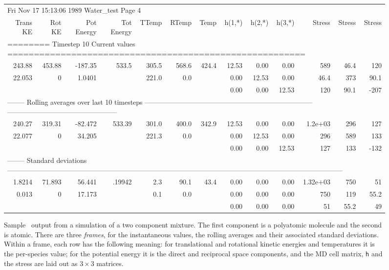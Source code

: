 \begin{figure}
\caption[Sample \moldy\  output.]{Sample \moldy\  output from a simulation 
of a two component mixture.  The first component is a polyatomic
molecule and the second is atomic.  There are three {\em frames}, for
the instantaneous values, the rolling averages and their associated
standard deviations.  Within a frame, each row has the following
meaning: for translational and rotational kinetic energies and
temperatures it is the per-species value; for the potential energy it
is the direct and reciprocal space components, and the MD cell matrix,
{\tt h} and the stress are laid out as $3\times 3$ matrices.}
\label{fig:output}
\tiny
%
\begin{tabular}{rrrrrrrr
@{\hspace{1em}}r@{\hspace{1em}}rr@{\hspace{1em}}r@{\hspace{1em}}r}
\multicolumn{13}{l}{      Fri Nov 17 15:13:06 1989        Water\_test
Page 4} \\
Trans KE & Rot KE & Pot Energy & Tot Energy & TTemp & RTemp & Temp &
h(1,*) & h(2,*) & h(3,*) & Stress & Stress & Stress \\
\multicolumn{13}{l}{ ======== Timestep 10      Current values
======================================================== } \\
243.88 & 453.88  & -187.35  & 533.5  & 305.5  & 568.6  & 424.4  &
12.53  & 0.00  & 0.00  & 589  & 46.4  & 120 \\
22.053  & 0  & 1.0401 & & 221.0  & 0.0 & & 0.00  & 12.53  & 0.00  & 46.4
& 373  & 90.1 \\
 &  &  &  &  & & &  0.00  & 0.00  & 12.53 & 120  & 90.1  & -207 \\
\multicolumn{13}{l}{ -------- Rolling averages over last 10 timesteps
--------------------------------------------------------------------------
------------------------------------------------
} \\
240.27 & 319.31 & -82.472 & 533.39 & 301.0 & 400.0 & 342.9 & 12.53 &
0.00 & 0.00 & 1.2e+03 & 296 & 127 \\
22.077 & 0 & 34.205  & & 221.3 & 0.0 & & 0.00 & 12.53 & 0.00 & 296 &
589 & 133 \\
& & & & & & & 0.00 & 0.00 & 12.53 & 127 & 133 & -132 \\
\multicolumn{13}{l}{ -------- Standard deviations
---------------------------------------------------------------------------------------------------------------------------------------------------
} \\
1.8214 & 71.893 & 56.441 & .19942 & 2.3 & 90.1 & 43.4 & 0.00 & 0.00 &
0.00 & 1.32e+03 & 750 & 51 \\
0.013 & 0 & 17.173 & & 0.1 & 0.0 & & 0.00 & 0.00 & 0.00 & 750 & 119 & 55.2 \\
 & & &  &  &  &  & 0.00  & 0.00 & 0.00 & 51 & 55.2 & 49 \\
\end{tabular}
\end{figure}

